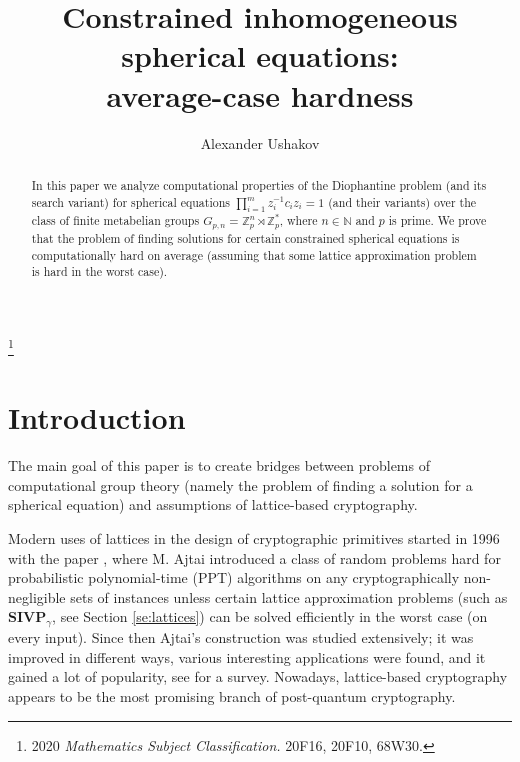 \documentclass{jgcc}
\def\SIVP{{\mathbf{SIVP}}}
\def\MN{{\mathbb{N}}}
\def\MZ{{\mathbb{Z}}}
\begin{document}
\title[Constrained inhomogeneous spherical equations]{Constrained inhomogeneous spherical equations:\\ average-case hardness}
\author{Alexander Ushakov}
\address{Department of Mathematical Sciences, Stevens Institute of Technology, Hoboken NJ 07030, USA}
\thanks{2020 \textit{Mathematics Subject Classification.} 20F16, 20F10, 68W30.}

\begin{abstract}
In this paper we analyze computational properties of the Diophantine problem
(and its search variant) for spherical equations 
$\prod_{i=1}^m z_i^{-1} c_i z_i = 1$ (and their variants)
over the class of finite metabelian groups 
$G_{p,n}=\MZ_p^n \rtimes \MZ_p^\ast$,
where $n\in\MN$ and $p$ is prime.
We prove that the problem of finding solutions for certain 
constrained spherical equations is computationally hard on average
(assuming that some lattice approximation problem is hard in the worst case).
\end{abstract}


\maketitle

\section{Introduction}

The main goal of this paper is to create bridges
between problems of computational group theory
(namely the problem of finding a solution for a spherical equation)
and assumptions of lattice-based cryptography.

Modern uses of lattices in the design of cryptographic primitives started in 1996 with the paper \cite{Ajtai-1996},
where M. Ajtai introduced a class of random problems
hard for probabilistic polynomial-time (PPT) algorithms
on any cryptographically non-negligible sets of instances
unless certain lattice approximation problems
(such as $\SIVP_\gamma$, see Section \ref{se:lattices})
can be solved efficiently in the worst case (on every input).
Since then Ajtai's construction was studied extensively;
it was improved in different ways, various interesting
applications were found, and it gained a lot of popularity,
see \cite{Peikert:2016} for a survey.
Nowadays, lattice-based cryptography appears to be the most
promising branch of post-quantum cryptography.
\end{document}
